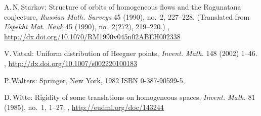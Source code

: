\begin{references}{99}
A.\,N.\,Starkov:
Structure of orbits of homogeneous flows and the Ragunatana conjecture,
\emph{Russian Math. Surveys} 45 (1990), no.~2, 227--228. 
 (Translated from \emph{Uspekhi Mat. Nauk} 45 (1990), no.~2(272), 219--220.)
,
\maynewline
\url{http://dx.doi.org/10.1070/RM1990v045n02ABEH002338}

V.\,Vatsal:
Uniform distribution of Heegner points,
\emph{Invent. Math.} 148 (2002)  1--46.
,
\maynewline
\url{http://dx.doi.org/10.1007/s002220100183}

 P.\,Walters:
 Springer, New York, 1982
 ISBN 0-387-90599-5,

D.\,Witte:
Rigidity of some translations on homogeneous spaces,
\emph{Invent. Math.}  81  (1985),  no.~1, 1--27.
,
\maynewline
\url{http://eudml.org/doc/143244}


\end{references}

